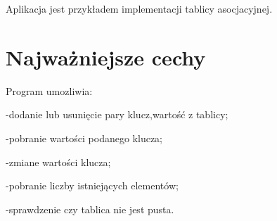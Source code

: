 \-Aplikacja jest przykładem implementacji tablicy asocjacyjnej.\hypertarget{index_etykieta-wazne-cechy}{}\section{\-Najważniejsze cechy}\label{index_etykieta-wazne-cechy}
\-Program umozliwia\-: \par
 -\/dodanie lub usunięcie pary klucz,wartość z tablicy; \par
 -\/pobranie wartości podanego klucza; \par
 -\/zmiane wartości klucza; \par
 -\/pobranie liczby istniejących elementów; \par
 -\/sprawdzenie czy tablica nie jest pusta. 
